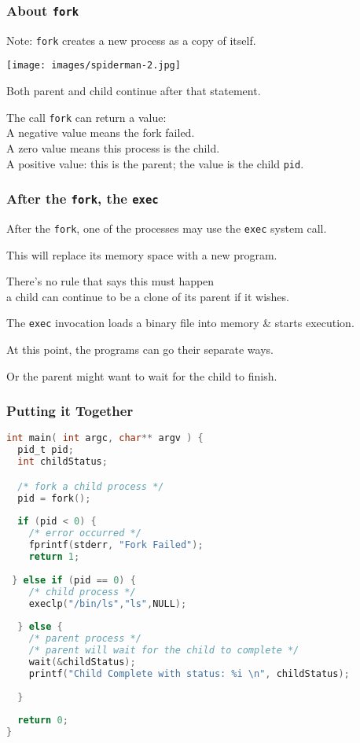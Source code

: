 \begin{frame}
	\frametitle{About \texttt{fork}}

	Note: \texttt{fork} creates a new process as a copy of itself.

	\begin{center}
		\texttt{[image: images/spiderman-2.jpg]}
	\end{center}

	Both parent and child continue after that statement.

	The call \texttt{fork} can return a value:\\
	\quad A negative value means the fork failed.\\
	\quad A zero value means this process is the child.\\
	\quad A positive value: this is the parent; the value is the child \texttt{pid}.

\end{frame}

\begin{frame}
	\frametitle{After the \texttt{fork}, the \texttt{exec}}


	After the \texttt{fork}, one of the processes may use the \texttt{exec} system call.

	This will replace its memory space with a new program.

	There's no rule that says this must happen\\
	\quad a child can continue to be a clone of its parent if it wishes.

	The \texttt{exec} invocation loads a binary file into memory \& starts execution.

	At this point, the programs can go their separate ways.

	Or the parent might want to wait for the child to finish.


\end{frame}

\begin{frame}[fragile]
	\frametitle{Putting it Together}

	{\scriptsize
		\begin{lstlisting}[language=C]
int main( int argc, char** argv ) {
  pid_t pid;
  int childStatus;

  /* fork a child process */
  pid = fork();
  
  if (pid < 0) { 
    /* error occurred */ 
    fprintf(stderr, "Fork Failed"); 
    return 1;
  
 } else if (pid == 0) {    
    /* child process */
    execlp("/bin/ls","ls",NULL);
    
  } else {    
    /* parent process */
    /* parent will wait for the child to complete */
    wait(&childStatus);
    printf("Child Complete with status: %i \n", childStatus);
    
  }
    
  return 0;
}
\end{lstlisting}
	}

\end{frame}

